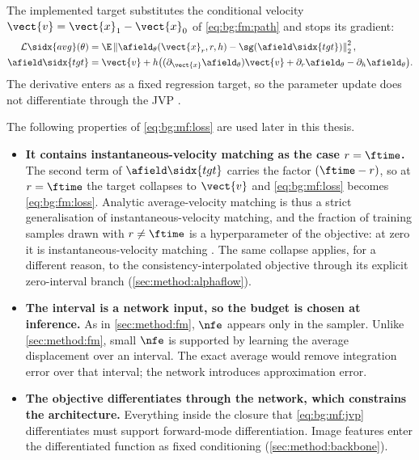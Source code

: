 The implemented target substitutes the conditional velocity
$\vect{v}=\vect{x}_{1}-\vect{x}_{0}$ of \eqref{eq:bg:fm:path} and stops its gradient:
\begin{equation}\label{eq:bg:mf:loss}
\begin{aligned}
  \mathcal{L}\sidx{avg}(\theta)
    &=\E\left\|\afield_{\theta}(\vect{x}_{r},r,h)
           -\sg(\afield\sidx{tgt})\right\|_{2}^{2},\\
  \afield\sidx{tgt}
    &=\vect{v}+h\big((\partial_{\vect{x}}\afield_{\theta})\vect{v}
                     +\partial_{r}\afield_{\theta}-\partial_{h}\afield_{\theta}\big).
\end{aligned}
\end{equation}
The derivative enters as a fixed regression target, so the parameter update does not differentiate
through the JVP \parencite[Eqs.~(7)--(11)]{geng2025meanflow}.

The following properties of \eqref{eq:bg:mf:loss} are used later in this thesis.

\begin{itemize}
  \item \textbf{It contains instantaneous-velocity matching as the case $r = \ftime$.} The second term of
    $\afield\sidx{tgt}$ carries the factor $(\ftime-r)$, so at $r=\ftime$ the target collapses to
    $\vect{v}$ and \eqref{eq:bg:mf:loss} becomes \eqref{eq:bg:fm:loss}. Analytic
    average-velocity matching is thus a strict generalisation of instantaneous-velocity matching, and the fraction of training
    samples drawn with $r \neq \ftime$ is a hyperparameter of the objective: at zero it is
    instantaneous-velocity matching
    \parencite[Tab.~1a]{geng2025meanflow}. The same collapse applies, for a different reason, to the
    consistency-interpolated objective through its explicit zero-interval branch
    (\autoref{sec:method:alphaflow}).
  \item \textbf{The interval is a network input, so the budget is chosen at inference.} As in
    \autoref{sec:method:fm}, $\nfe$ appears only in the sampler. Unlike \autoref{sec:method:fm}, small $\nfe$ is
    supported by learning the average displacement over an interval. The exact average would
    remove integration error over that interval; the network introduces approximation error.
  \item \textbf{The objective differentiates through the network, which constrains the
    architecture.} Everything inside the closure that \eqref{eq:bg:mf:jvp} differentiates must
    support forward-mode differentiation. Image features enter the differentiated function as
    fixed conditioning (\autoref{sec:method:backbone}).
\end{itemize}

